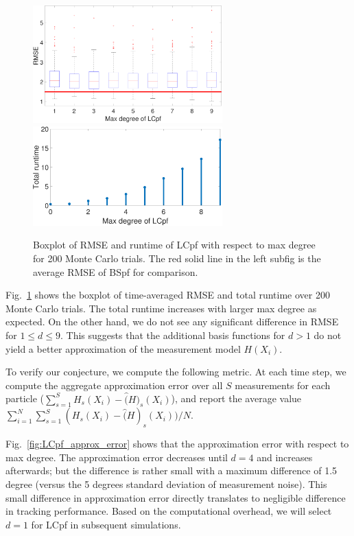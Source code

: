 \documentclass[10pt,letterpaper,final]{article}
\begin{document}
\begin{figure}
\centering
\includegraphics[width=0.65\textwidth]{Figures/RMSE_maxDegree}
\includegraphics[width=0.65\textwidth]{Figures/runtime_maxDegree}
\caption{Boxplot of RMSE and runtime of LCpf with respect to max degree for 200 Monte Carlo trials. The red solid line in the left subfig is the average RMSE of BSpf for comparison.}
\label{fig:results_maxDegree}
\end{figure}

Fig.~\ref{fig:results_maxDegree} shows the boxplot of time-averaged RMSE and total runtime over 200 Monte Carlo trials. The total runtime increases with larger max degree as expected. On the other hand, we do not see any significant difference in RMSE for $1\leq d \leq 9$. This suggests that the additional basis functions for $d>1$ do not yield a better approximation of the measurement model $H(X_i)$. 

To verify our conjecture, we compute the following metric. At each time step, we compute the aggregate approximation error over all $S$ measurements for each particle ($\sum_{s=1}^S H_s(X_i)-\hat(H)_s(X_i)$), and report the average value $\sum_{i=1}^N \sum_{s=1}^S(H_s(X_i)-\hat(H)_s(X_i))/N$. 

Fig.~\ref{fig:LCpf_approx_error} shows that the approximation error with respect to max degree. The approximation error decreases until $d=4$ and increases afterwards; but the difference is rather small with a maximum difference of 1.5 degree (versus the 5 degrees standard deviation of measurement noise). This small difference in approximation error directly translates to negligible difference in tracking performance. Based on the computational overhead, we will select $d=1$ for LCpf in subsequent simulations. 
\end{document}
